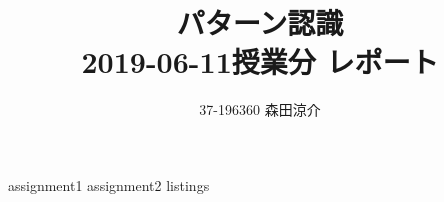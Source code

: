 \documentclass[dvipdfmx, fleqn]{jsarticle}
\title{
    パターン認識 \\
    2019-06-11授業分 レポート
    }
\author{37-196360 \quad 森田涼介}
\begin{document}
\maketitle
{assignment1}
\clearpage
{assignment2}
\clearpage
{listings}
\end{document}
